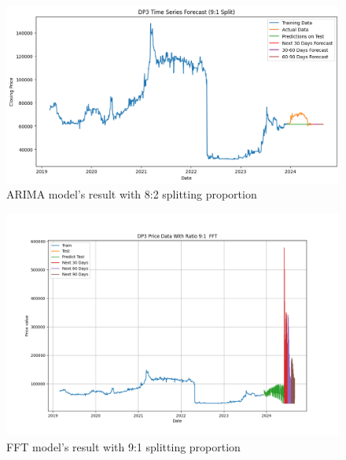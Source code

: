 \documentclass{ieeeojies}
\begin{document}
\begin{figure}[H]
  \centering
  \begin{minipage}{0.8\linewidth}
    \centering
    \includegraphics[width=\linewidth]{bibliography/Figure/DP3_ARIMA.png}
    \caption{ARIMA model's result with 8:2 splitting proportion}
    \label{fig8}
  \end{minipage}
\end{figure}

\begin{figure}[H]
  \centering
  \begin{minipage}{0.8\linewidth}
    \centering
    \includegraphics[width=\linewidth]{bibliography/Figure/FFT_91_DP3.png}
    \caption{FFT model's result with 9:1 splitting proportion}
    \label{fig8}
  \end{minipage}
\end{figure}
\end{document}
